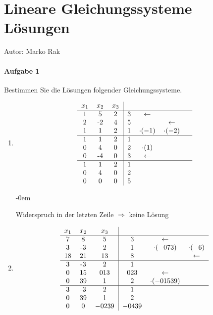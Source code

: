 \chapter{Lineare Gleichungssysteme L\"osungen}
	
	Autor: Marko Rak
	
	\subsubsection{Aufgabe 1}
	
		Bestimmen Sie die L\"osungen folgender Gleichungssysteme.
		
			\begin{enumerate}\abovedisplayskip-0em
				\item 
				
					\[
						\begin{tabular} {ccc|cccc}
							$x_1$ & $x_2$ & $x_3$ & & &\\
							\hline
							1 & 5 & 2 & 3 & $\leftarrow$ & \\
							2 & -2 & 4 & 5 & & $\leftarrow$ \\
							1 & 1 & 2 & 1 & $\cdot(-1)$ & $\cdot(-2)$ \\
							\hline
							1 & 1 & 2 & 1 & & & \\
							0 & 4 & 0 & 2 & $\cdot(1)$ & & \\
							0 & -4 & 0 & 3 & $\leftarrow$ & & \\
							\hline
							1 & 1 & 2 & 1 & & & \\
							0 & 4 & 0 & 2 & & & \\
							0 & 0 & 0 & 5 & & & \\
						\end{tabular}
					\]
					
					\abovedisplayskip-0em
					
					Widerspruch in der letzten Zeile $\Rightarrow$ keine L\"osung

					
				\item
				
					\[
						\begin{tabular} {ccc|ccc}
							$x_1$ & $x_2$ & $x_3$ & & &\\
							\hline
							7 & 8 & 5 & 3 & $\leftarrow$ & \\
							3 & -3 & 2 & 1 & $\cdot(-\frac{7}{3})$ & $\cdot(-6)$ \\
							18 & 21 & 13 & 8 & & $\leftarrow$ \\
							\hline
							3 & -3 & 2 & 1 & & \\
							0 & 15 & $\frac{1}{3}$ & $\frac{2}{3}$ & $\leftarrow$ & \\
							0 & 39 & 1 & 2 & $\cdot(-\frac{15}{39})$ & \\
							\hline
							3 & -3 & 2 & 1 & & \\
							0 & 39 & 1 & 2 & & \\
							0 & 0 & $-\frac{2}{39}$ & $-\frac{4}{39}$ & & \\
						\end{tabular}
					\]
					

\end{enumerate}
